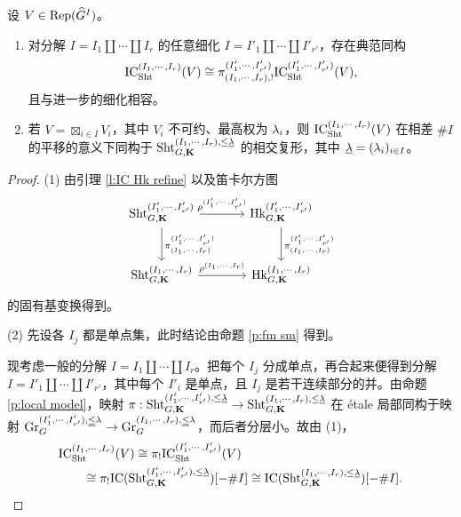 \begin{lem}\label{l:IC Sht refine} 设 $V\in \textup{Rep}(\widehat{G}^{I})$。
\begin{enumerate}
\item 对分解 $I=I_{1}\coprod\cdots \coprod I_{r}$ 的任意细化 $I=I'_{1}\coprod\cdots \coprod I'_{r'}$，存在典范同构
\begin{equation*}
\textup{IC}^{(I_{1},\cdots, I_{r})}_{\textup{Sht}}(V)\cong \pi^{(I'_{1},\cdots, I'_{r'})}_{(I_{1},\cdots, I_{r}), !}\textup{IC}^{(I'_{1},\cdots, I'_{r'})}_{\textup{Sht}}(V),
\end{equation*}
且与进一步的细化相容。
\item 若 $V=\boxtimes_{i\in I}V_{i}$，其中 $V_{i}$ 不可约、最高权为 $\lambda_{i}$，则 $\textup{IC}^{(I_{1},\cdots, I_{r})}_{\textup{Sht}}(V)$ 在相差 $\#I$ 的平移的意义下同构于 $\textup{Sht}^{(I_{1},\cdots, I_{r}), \le\underline{\lambda}}_{G,\mathbf{K}}$ 的相交复形，其中 $\underline{\lambda}=(\lambda_{i})_{i\in I}$。
\end{enumerate}
\end{lem}
\begin{proof}
(1) 由引理 \ref{l:IC Hk refine} 以及笛卡尔方图
\begin{equation*}
\begin{tikzcd}[column sep=large, row sep=large]
\Sht^{(I'_{1},\cdots, I'_{r'})}_{G,\bK} \arrow[r, "\r^{(I'_{1},\cdots, I'_{r'})}"] \arrow[d, "\pi^{(I'_{1},\cdots, I'_{r'})}_{(I_{1},\cdots, I_{r})}"] & \Hk^{(I'_{1},\cdots, I'_{r'})}_{G,\bK} \arrow[d, "\pi^{(I'_{1},\cdots, I'_{r'})}_{(I_{1},\cdots, I_{r})}"] \\
\Sht^{(I_{1},\cdots, I_{r})}_{G,\bK} \arrow[r, "\r^{(I_{1},\cdots, I_{r})}"] & \Hk^{(I_{1},\cdots, I_{r})}_{G,\bK}
\end{tikzcd}
\end{equation*}
的固有基变换得到。

(2) 先设各 $I_{j}$ 都是单点集，此时结论由命题 \ref{p:fm sm} 得到。

现考虑一般的分解 $I=I_{1}\coprod\cdots\coprod I_{r}$。把每个 $I_{j}$ 分成单点，再合起来便得到分解 $I=I'_{1}\coprod\cdots\coprod I'_{r'}$，其中每个 $I'_{i}$ 是单点，且 $I_{j}$ 是若干连续部分的并。由命题 \ref{p:local model}，映射 $\pi: \textup{Sht}^{(I'_{1},\cdots, I'_{r'}),\le\underline{\lambda}}_{G,\mathbf{K}}\to\textup{Sht}^{(I_{1},\cdots, I_{r}),\le\underline{\lambda}}_{G,\mathbf{K}}$ 在 \'etale 局部同构于映射 $\textup{Gr}^{(I'_{1},\cdots, I'_{r'}),\underline\le\lambda}_{G}\to \textup{Gr}^{(I_{1},\cdots, I_{r}),\underline\le\lambda}_{G}$，而后者分层小。故由 (1)，
\begin{equation*}
\begin{aligned}
&\textup{IC}^{(I_{1},\cdots, I_{r})}_{\textup{Sht}}(V)\cong \pi_{!}\textup{IC}^{(I'_{1},\cdots, I'_{r'})}_{\textup{Sht}}(V)\\
&\qquad\cong\pi_{!}\textup{IC}(\textup{Sht}^{(I'_{1},\cdots, I'_{r'}),\le\underline{\lambda}}_{G,\mathbf{K}})[-\#I]
\cong\textup{IC}(\textup{Sht}^{(I_{1},\cdots, I_{r}),\le\underline{\lambda}}_{G,\mathbf{K}})[-\#I].
\end{aligned}
\end{equation*}
\end{proof}


